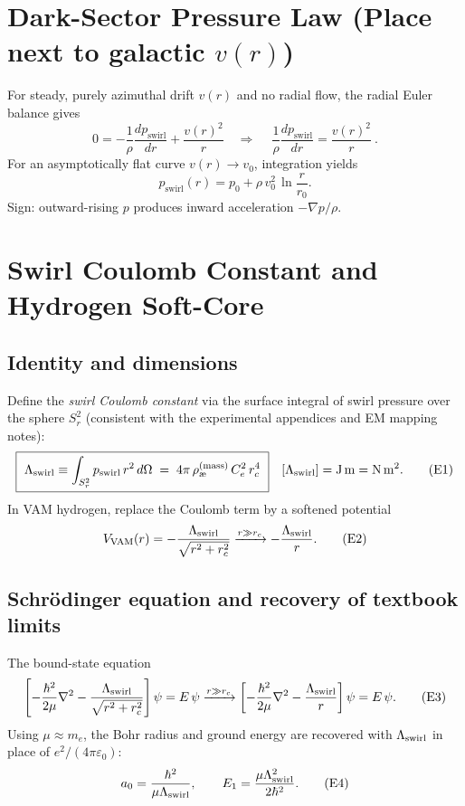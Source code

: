 \documentclass[11pt]{article}
\begin{document}
    \section{Dark-Sector Pressure Law (Place next to galactic \(v(r)\))}
    \label{sec:darkpressure}
    For steady, purely azimuthal drift \(v(r)\) and no radial flow, the radial Euler balance gives
    \begin{equation}
        0=-\frac{1}{\rho}\frac{dp_{\text{swirl}}}{dr}+\frac{v(r)^2}{r}
        \quad\Longrightarrow\quad
        \boxed{\ \frac{1}{\rho}\frac{dp_{\text{swirl}}}{dr}=\frac{v(r)^2}{r}\ } . \tag{D1}\label{eq:darklaw}
    \end{equation}
    For an asymptotically flat curve \(v(r)\to v_0\), integration yields
    \begin{equation}
        p_{\text{swirl}}(r)=p_0+\rho\,v_0^2\,\ln\!\frac{r}{r_0}. \tag{D2}
    \end{equation}
    Sign: outward-rising \(p\) produces inward acceleration \(-\nabla p/\rho\).

    \section{Swirl Coulomb Constant and Hydrogen Soft-Core}
    \label{sec:lambda-hydrogen}
    \subsection{Identity and dimensions}
    Define the \emph{swirl Coulomb constant} via the surface integral of swirl pressure over the sphere \(S_r^2\) (consistent with the experimental appendices and EM mapping notes):
    \begin{equation}
        \boxed{\ \Lam \equiv \int_{S_r^2} p_{\text{swirl}}\, r^2\, d\Omega \;=\; 4\pi\,\aeMass\,\Ce^2\,\rc^4\ } \quad [\Lam]=\mathrm{J\,m} = \mathrm{N\,m^2}. \tag{E1}\label{eq:LambdaDef}
    \end{equation}
    In VAM hydrogen, replace the Coulomb term by a softened potential
    \begin{equation}
        V_{\text{VAM}}(r) = -\frac{\Lambda_{\text{swirl}}}{\sqrt{r^2+r_c^2}} \xrightarrow{r\gg r_c} -\frac{\Lambda_{\text{swirl}}}{r}. \tag{E2}\label{eq:softcore}
    \end{equation}
    \subsection{Schr\"odinger equation and recovery of textbook limits \cite{Schrodinger1926,Jackson1999}}
    The bound-state equation
    \begin{equation}
        \left[-\frac{\hbar^2}{2\mu}\nabla^2 - \frac{\Lambda_{\text{swirl}}}{\sqrt{r^2+r_c^2}}\right]\psi = E\,\psi \xrightarrow{r\gg r_c} \left[-\frac{\hbar^2}{2\mu}\nabla^2 - \frac{\Lambda_{\text{swirl}}}{r}\right]\psi = E\,\psi . \tag{E3}
    \end{equation}
    Using \(\mu\approx m_e\), the Bohr radius and ground energy are recovered with \(\Lambda_{\text{swirl}}\) in place of \(e^2/(4\pi\varepsilon_0)\):
    \begin{equation}
        a_0=\frac{\hbar^2}{\mu \Lambda_{\text{swirl}}},\qquad E_1=\frac{\mu \Lambda_{\text{swirl}}^2}{2\hbar^2}. \tag{E4}
    \end{equation}
\end{document}
